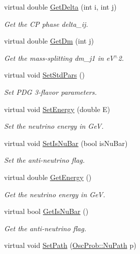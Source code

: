 \begin{DoxyCompactItemize}
virtual double \hyperlink{classOscProb_1_1PMNS__Base_adb8dbc91d4286d2e7c8f768c59476241}{Get\+Delta} (int i, int j)
\begin{DoxyCompactList}\small\item\em Get the CP phase delta\+\_\+ij. \end{DoxyCompactList}\item 
virtual double \hyperlink{classOscProb_1_1PMNS__Base_ad26815ac5f4805d1259817e4936e5f8f}{Get\+Dm} (int j)
\begin{DoxyCompactList}\small\item\em Get the mass-\/splitting dm\+\_\+j1 in e\+V$^\wedge$2. \end{DoxyCompactList}\item 
virtual void \hyperlink{classOscProb_1_1PMNS__Base_a4de96ac9b6d1e9b029ab877e57d211ad}{Set\+Std\+Pars} ()
\begin{DoxyCompactList}\small\item\em Set P\+DG 3-\/flavor parameters. \end{DoxyCompactList}\item 
virtual void \hyperlink{classOscProb_1_1PMNS__Base_a95b3b0d0cab5e6a54b5ef99587f837c0}{Set\+Energy} (double E)
\begin{DoxyCompactList}\small\item\em Set the neutrino energy in GeV. \end{DoxyCompactList}\item 
virtual void \hyperlink{classOscProb_1_1PMNS__Base_a717e0348cf762f3961854e332a9b52e0}{Set\+Is\+Nu\+Bar} (bool is\+Nu\+Bar)
\begin{DoxyCompactList}\small\item\em Set the anti-\/neutrino flag. \end{DoxyCompactList}\item 
virtual double \hyperlink{classOscProb_1_1PMNS__Base_acc0d46cc4b8f911b40b807225003bbed}{Get\+Energy} ()
\begin{DoxyCompactList}\small\item\em Get the neutrino energy in GeV. \end{DoxyCompactList}\item 
virtual bool \hyperlink{classOscProb_1_1PMNS__Base_a2f7f2a028dfe7a90fff6b4f757972c2c}{Get\+Is\+Nu\+Bar} ()
\begin{DoxyCompactList}\small\item\em Get the anti-\/neutrino flag. \end{DoxyCompactList}\item 
virtual void \hyperlink{classOscProb_1_1PMNS__Base_ac3b644fd0a56347d304ceca4ae9d8875}{Set\+Path} (\hyperlink{structOscProb_1_1NuPath}{Osc\+Prob\+::\+Nu\+Path} p)

\end{DoxyCompactItemize}

